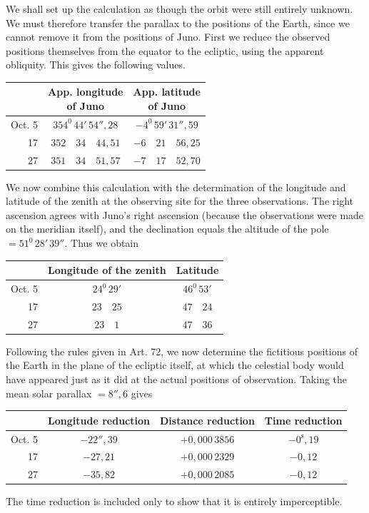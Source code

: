 We shall set up the calculation as though the orbit were still entirely unknown. We must therefore transfer the parallax to the positions of the Earth, since we cannot remove it from the positions of Juno. First we reduce the observed positions themselves from the equator to the ecliptic, using the apparent obliquity. This gives the following values.
\begin{center}
\small\setlength{\tabcolsep}{6pt}\renewcommand{\arraystretch}{1.2}
\begin{tabular}{|r|c|c|}
\hline
 & \shortstack{App. longitude\\of Juno} & \shortstack{App. latitude\\of Juno}\\
\hline
Oct. 5 & $354^{0}\,44'\,54''{,}28$ & $-4^{0}\,59'\,31''{,}59$\\
17 & $352\quad34\quad44{,}51$ & $-6\quad21\quad56{,}25$\\
27 & $351\quad34\quad51{,}57$ & $-7\quad17\quad52{,}70$\\
\hline
\end{tabular}
\end{center}

We now combine this calculation with the determination of the longitude and latitude of the zenith at the observing site for the three observations. The right ascension agrees with Juno's right ascension (because the observations were made on the meridian itself), and the declination equals the altitude of the pole $=51^{0}\,28'\,39''$.
Thus we obtain
\begin{center}
\small\setlength{\tabcolsep}{6pt}\renewcommand{\arraystretch}{1.2}
\begin{tabular}{|r|c|c|}
\hline
 & Longitude of the zenith & Latitude\\
\hline
Oct. 5 & $24^{0}\,29'$ & $46^{0}\,53'$\\
17 & $23\quad25$ & $47\quad24$\\
27 & $23\quad1$ & $47\quad36$\\
\hline
\end{tabular}
\end{center}
\noindent{}Following the rules given in Art. 72, we now determine the fictitious positions of the Earth in the plane of the ecliptic itself, at which the celestial body would have appeared just as it did at the actual positions of observation. Taking the mean solar parallax $=8''{,}6$ gives
\begin{center}
\small\setlength{\tabcolsep}{4pt}\renewcommand{\arraystretch}{1.2}
\begin{tabular}{|r|c|c|c|}
\hline
 & Longitude reduction & Distance reduction & Time reduction\\
\hline
Oct. 5 & $-22''{,}39$ & $+0{,}000\,3856$ & $-0^{\mathrm{s}}{,}19$\\
17 & $-27{,}21$ & $+0{,}000\,2329$ & $-0{,}12$\\
27 & $-35{,}82$ & $+0{,}000\,2085$ & $-0{,}12$\\
\hline
\end{tabular}
\end{center}
\noindent The time reduction is included only to show that it is entirely imperceptible.

